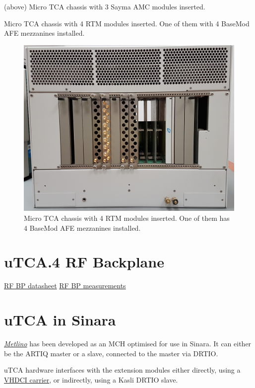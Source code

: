 (above) Micro TCA chassis with 3 Sayma AMC modules inserted.

Micro TCA chassis with 4 RTM modules inserted. One of them with 4
BaseMod AFE mezzanines installed.

\begin{figure}[htbp!]
\centering
\includegraphics[width=15cm]{img/MTCA_Back.jpg}
\caption{Micro TCA chassis with 4 RTM modules inserted. One of them has
4 BaseMod AFE mezzanines installed.}
\end{figure}

\section{uTCA.4 RF Backplane}\label{utca.4-rf-backplane}

\href{http://mtca.desy.de/sites/site_mtca/content/e172206/e205636/e212584/e248086/uRFB_concept_Datasheet_19.12.2014_eng.pdf}{RF
BP datasheet}
\href{http://ieeexplore.ieee.org/stamp/stamp.jsp?arnumber=7097413\&tag=1}{RF
BP measurements}

\section{uTCA in Sinara}\label{utca-in-sinara}

\href{Metlino}{\emph{Metlino}} has been developed as an MCH optimised
for use in Sinara. It can either be the ARTIQ master or a slave,
connected to the master via DRTIO.

uTCA hardware interfaces with the extension modules either directly,
using a \href{VHDCICarrier}{VHDCI carrier}, or indirectly, using a Kasli
DRTIO slave.


